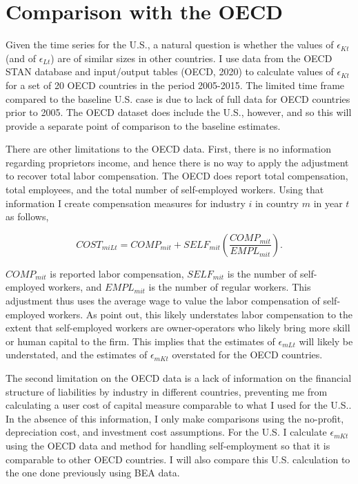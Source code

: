 \section{Comparison with the OECD}
Given the time series for the U.S., a natural question is whether the values of $\epsilon_{Kt}$ (and of $\epsilon_{Lt}$) are of similar sizes in other countries. I use data from the OECD STAN database \citep{stan} and input/output tables (OECD, 2020) \nocite{oecdio} to calculate values of $\epsilon_{Kt}$ for a set of 20 OECD countries in the period 2005-2015. The limited time frame compared to the baseline U.S. case is due to lack of full data for OECD countries prior to 2005. The OECD dataset does include the U.S., however, and so this will provide a separate point of comparison to the baseline estimates.

There are other limitations to the OECD data. First, there is no information regarding proprietors income, and hence there is no way to apply the \cite{gommerupert2004} adjustment to recover total labor compensation. The OECD does report total compensation, total employees, and the total number of self-employed workers. Using that information I create compensation measures for industry $i$ in country $m$ in year $t$ as follows,

\begin{equation}
	COST_{miLt} = COMP_{mit} + SELF_{mit} \left(\frac{COMP_{mit}}{EMPL_{mit}}\right).
\end{equation}

$COMP_{mit}$ is reported labor compensation, $SELF_{mit}$ is the number of self-employed workers, and $EMPL_{mit}$ is the number of regular workers. This adjustment thus uses the average wage to value the labor compensation of self-employed workers. As \cite{gommerupert2004} point out, this likely understates labor compensation to the extent that self-employed workers are owner-operators who likely bring more skill or human capital to the firm. This implies that the estimates of $\epsilon_{mLt}$ will likely be understated, and the estimates of $\epsilon_{mKt}$ overstated for the OECD countries.

The second limitation on the OECD data is a lack of information on the financial structure of liabilities by industry in different countries, preventing me from calculating a user cost of capital measure comparable to what I used for the U.S.. In the absence of this information, I only make comparisons using the no-profit, depreciation cost, and investment cost assumptions. For the U.S. I calculate $\epsilon_{mKt}$ using the OECD data and method for handling self-employment so that it is comparable to other OECD countries. I will also compare this U.S. calculation to the one done previously using BEA data.

